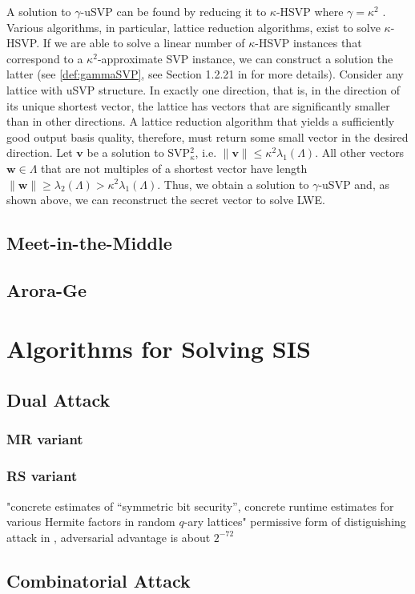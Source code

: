 A solution to $\gamma$-uSVP can be found by reducing it to $\kappa$-HSVP where $\gamma = \kappa^2$ \cite{APS15}. Various algorithms, in particular, lattice reduction algorithms, exist to solve $\kappa$-HSVP. If we are able to solve a linear number of $\kappa$-HSVP instances that correspond to a $\kappa^2$-approximate SVP instance, we can construct a solution the latter (see \cref{def:gammaSVP}, see Section 1.2.21 in \cite{Lov87} for more details). 
Consider any lattice with uSVP structure. In exactly one direction, that is, in the direction of its unique shortest vector, the lattice has vectors that are significantly smaller than in other directions. A lattice reduction algorithm that yields a sufficiently good output basis quality, therefore, must return some small vector in the desired direction. 
Let $\mathbf{v}$ be a solution to SVP$_\kappa^2$, i.e. $\|\mathbf{v}\| \leq \kappa^2 \lambda_1(\Lambda)$. All other vectors $\mathbf{w}\in \Lambda$ that are not multiples of a shortest vector have length $\|\mathbf{w}\| \geq \lambda_2(\Lambda) > \kappa^2\lambda_1(\Lambda)$. Thus, we obtain a solution to $\gamma$-uSVP and, as shown above, we can reconstruct the secret vector to solve LWE. 




\subsection{Meet-in-the-Middle \cite{APS15}}



\subsection{Arora-Ge \cite{AG11}}




\section{Algorithms for Solving SIS}
\subsection{Dual Attack \cite{MR09, RS10}}
\subsubsection{MR variant \cite{MR09}}



\subsubsection{RS variant \cite{RS10}}
"concrete estimates of ``symmetric bit security'', concrete runtime estimates for various Hermite factors in random $q$-ary lattices"
permissive form of distiguishing attack in \cite{MR09}, adversarial advantage is about $2^{-72}$



\subsection{Combinatorial Attack \cite{MR09}}